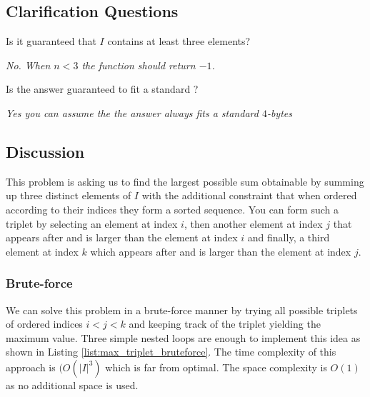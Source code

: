 \subsection{Clarification Questions}

\begin{QandA}
	\item \begin{questionitem} \begin{question} Is it guaranteed that $I$ contains at least three elements?  \end{question} 	 
    \begin{answered}
		\textit{No. When $n < 3$ the function should return $-1$.}
	\end{answered} \end{questionitem}
	\item \begin{questionitem} \begin{question} Is the answer guaranteed to fit a standard ?  \end{question} 	 
    \begin{answered}
		\textit{Yes you can assume the the answer always fits a standard $4$-bytes }
	\end{answered} \end{questionitem}
\end{QandA}

\subsection{Discussion}
\label{max_triplet:sec:discussion}
This problem is asking us to find the largest possible sum obtainable by summing up three distinct
elements of $I$ with the additional constraint that when ordered according to their indices they
form a sorted sequence. You can form such a triplet by selecting an element at index $i$, then
another element at index $j$ that appears after and is larger than the element at index $i$
and finally, a third element at index $k$ which appears after and is larger than the element at
index $j$.

\subsubsection{Brute-force}
\label{max_triplet:sec:bruteforce}
We can solve this problem in a brute-force manner by trying all possible triplets of
ordered indices $i < j <k$ and keeping track of the triplet yielding the maximum value. Three simple
nested loops are enough to implement this idea as shown in Listing
\ref{list:max_triplet_bruteforce}. The time complexity of this approach is $(O(|I|^3)$ which is far
from optimal. The space complexity is $O(1)$ as no additional space is used.

